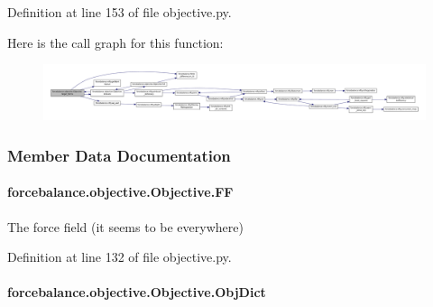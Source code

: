 Definition at line 153 of file objective.\-py.



Here is the call graph for this function\-:
\nopagebreak
\begin{figure}[H]
\begin{center}
\leavevmode
\includegraphics[width=350pt]{classforcebalance_1_1objective_1_1Objective_aa14af29457c3784b9b97b46186c230ce_cgraph}
\end{center}
\end{figure}




\subsubsection{Member Data Documentation}
\hypertarget{classforcebalance_1_1objective_1_1Objective_a99df04c43a075adc23eb8a5cf6b60ce3}{
\paragraph[{F\-F}]{\setlength{\rightskip}{0pt plus 5cm}forcebalance.\-objective.\-Objective.\-F\-F}}\label{classforcebalance_1_1objective_1_1Objective_a99df04c43a075adc23eb8a5cf6b60ce3}


The force field (it seems to be everywhere) 



Definition at line 132 of file objective.\-py.

\hypertarget{classforcebalance_1_1objective_1_1Objective_aee0b6ceda10120047e9ebe6f20c1f8a0}{
\paragraph[{Obj\-Dict}]{\setlength{\rightskip}{0pt plus 5cm}forcebalance.\-objective.\-Objective.\-Obj\-Dict}}\label{classforcebalance_1_1objective_1_1Objective_aee0b6ceda10120047e9ebe6f20c1f8a0}


